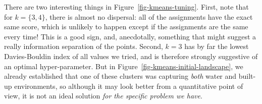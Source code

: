 \documentclass[
  letterpaper,
]{scrbook}
\begin{document}
\begin{figure}[bt]



\end{figure}%

There are two interesting things in Figure~\ref{fig-kmeans-tuning}.
First, note that for \(k=\{3,4\}\), there is almost no dispersal: all of
the assignments have the exact same score, which is unlikely to happen
except if the assignments are the same every time! This is a good sign,
and, anecdotally, something that might suggest a really information
separation of the points. Second, \(k = 3\) has by far the lowest
Davies-Bouldin index of all values we tried, and is therefore strongly
suggestive of an optimal hyper-parameter. But in
Figure~\ref{fig-kmeans-initial-landscape}, we already established that
one of these clusters was capturing \emph{both} water and built-up
environments, so although it may look better from a quantitative point
of view, it is not an ideal solution \emph{for the specific problem we
have}.
\end{document}
